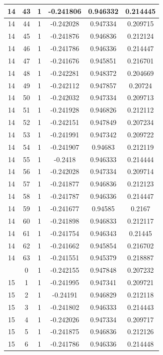 \documentclass[12pt,a4paper]{article}
\numberwithin{equation}{section}
\numberwithin{figure}{section}
\numberwithin{table}{section}
\begin{document}
\begin{longtable}{|c|c|c|c|c|c|}
14 & 43 & 1 & -0.241806 & 0.946332 & 0.214445 \\ \hline
14 & 44 & 1 & -0.242028 & 0.947334 & 0.209715 \\ \hline
14 & 45 & 1 & -0.241876 & 0.946836 & 0.212124 \\ \hline
14 & 46 & 1 & -0.241786 & 0.946336 & 0.214447 \\ \hline
14 & 47 & 1 & -0.241676 & 0.945851 & 0.216701 \\ \hline
14 & 48 & 1 & -0.242281 & 0.948372 & 0.204669 \\ \hline
14 & 49 & 1 & -0.242112 & 0.947857 & 0.20724 \\ \hline
14 & 50 & 1 & -0.242032 & 0.947334 & 0.209713 \\ \hline
14 & 51 & 1 & -0.241928 & 0.946826 & 0.212112 \\ \hline
14 & 52 & 1 & -0.242151 & 0.947849 & 0.207234 \\ \hline
14 & 53 & 1 & -0.241991 & 0.947342 & 0.209722 \\ \hline
14 & 54 & 1 & -0.241907 & 0.94683 & 0.212119 \\ \hline
14 & 55 & 1 & -0.2418 & 0.946333 & 0.214444 \\ \hline
14 & 56 & 1 & -0.242028 & 0.947334 & 0.209714 \\ \hline
14 & 57 & 1 & -0.241877 & 0.946836 & 0.212123 \\ \hline
14 & 58 & 1 & -0.241787 & 0.946336 & 0.214447 \\ \hline
14 & 59 & 1 & -0.241677 & 0.94585 & 0.2167 \\ \hline
14 & 60 & 1 & -0.241898 & 0.946833 & 0.212117 \\ \hline
14 & 61 & 1 & -0.241754 & 0.946343 & 0.21445 \\ \hline
14 & 62 & 1 & -0.241662 & 0.945854 & 0.216702 \\ \hline
14 & 63 & 1 & -0.241551 & 0.945379 & 0.218887 \\ \hline
\pagebreak
15 & 0 & 1 & -0.242155 & 0.947848 & 0.207232 \\ \hline
15 & 1 & 1 & -0.241995 & 0.947341 & 0.209721 \\ \hline
15 & 2 & 1 & -0.24191 & 0.946829 & 0.212118 \\ \hline
15 & 3 & 1 & -0.241802 & 0.946333 & 0.214443 \\ \hline
15 & 4 & 1 & -0.242026 & 0.947334 & 0.209717 \\ \hline
15 & 5 & 1 & -0.241875 & 0.946836 & 0.212126 \\ \hline
15 & 6 & 1 & -0.241786 & 0.946336 & 0.214448 \\ \hline

\end{longtable}
\end{document}
